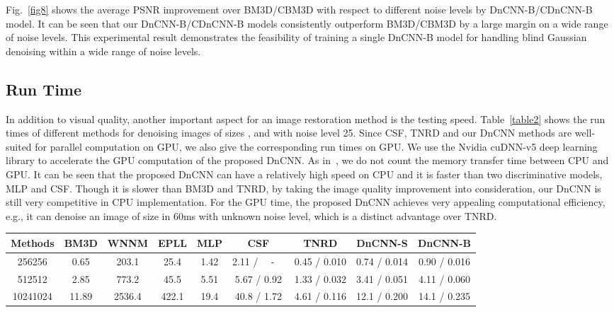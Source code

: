 \documentclass[journal]{IEEEtran}
\begin{document}
Fig.~\ref{fig8} shows the average PSNR improvement over BM3D/CBM3D with respect to different noise levels by DnCNN-B/CDnCNN-B model. It can be seen that our DnCNN-B/CDnCNN-B models consistently outperform BM3D/CBM3D by a large margin on a wide range of noise levels. This experimental result demonstrates the feasibility of training a single DnCNN-B model for handling blind Gaussian denoising within a wide range of noise levels.



\subsection{Run Time}

In addition to visual quality, another important aspect for an image restoration method is the testing speed.
Table~\ref{table2} shows the run times of different methods for denoising images of sizes ,  and  with noise level 25.
Since CSF, TNRD and our DnCNN methods are well-suited for parallel computation on GPU, we also give the corresponding run times on GPU.
We use the Nvidia cuDNN-v5 deep learning library to accelerate the GPU computation of the proposed DnCNN.
As in~\cite{chen2015trainable}, we do not count the memory transfer time between CPU and GPU.
It can be seen that the proposed DnCNN can have a relatively high speed on CPU and it is faster than two discriminative models, MLP and CSF.
Though it is slower than BM3D and TNRD, by taking the image quality improvement into consideration, our DnCNN is still very competitive in CPU implementation. For the GPU time, the proposed DnCNN achieves very appealing computational efficiency, e.g., it can denoise an image of size  in 60ms with unknown noise level, which is a distinct advantage over TNRD.


\begin{table*}[!htbp]
  \centering
  \caption{Run time (in seconds) of different methods on images of size ,  and  with noise level 25. For CSF, TNRD and our proposed DnCNN, we give the run times on CPU (left) and GPU (right).
  It is also worth noting that since the run time on GPU varies greatly with respect to GPU and GPU-accelerated library, it is hard to make a fair comparison between CSF, TNRD and our proposed DnCNN. Therefore, we just copy the run times of CSF and TNRD on GPU from the original papers.}
  \begin{tabular}{|c|c|c|c|c|c|c|c|c|}
    \hline
Methods & BM3D  & WNNM & EPLL& MLP & CSF & TNRD & DnCNN-S & DnCNN-B \\ \hline\hline
    256256 & 0.65   & 203.1& 25.4 & 1.42& 2.11 / ~~-~~ & 0.45 / 0.010 &  0.74 / 0.014&  0.90 / 0.016\\ \hline
    512512 & 2.85  & 773.2& 45.5 & 5.51 & 5.67 / 0.92 & 1.33 / 0.032 &  3.41 / 0.051 &  4.11 / 0.060\\ \hline
    10241024 & 11.89  & 2536.4&  422.1 & 19.4& 40.8 / 1.72 & 4.61 / 0.116 & 12.1 / 0.200 & 14.1 / 0.235\\
    \hline
  \end{tabular}
  \label{table2}
\end{table*}
\end{document}
